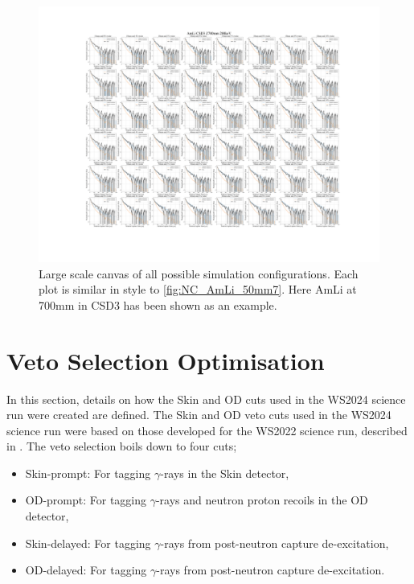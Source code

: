\begin{figure}
	\centering
	\includegraphics[width=\linewidth]{figures/VetoEfficiency/AmLi_CSD3_Z700mm_200keV.png}
	\caption{Large scale canvas of all possible simulation configurations. Each plot is similar in style to \autoref{fig:NC_AmLi_50mm7}. Here AmLi at 700mm in CSD3 has been shown as an example.}
	\label{fig:NC_Canvas}
\end{figure}


\section{Veto Selection Optimisation}
In this section, details on how the Skin and OD cuts used in the WS2024 science run were created are defined. The Skin and OD veto cuts used in the WS2024 science run were based on those developed for the WS2022 science run, described in \cite{LZCollaboration:2024lux}.
The veto selection boils down to four cuts;
\begin{itemize}
	\item Skin-prompt: For tagging $\gamma$-rays in the Skin detector,
	\item OD-prompt: For tagging $\gamma$-rays and neutron proton recoils in the OD detector,
	\item Skin-delayed: For tagging $\gamma$-rays from post-neutron capture de-excitation,
	\item OD-delayed: For tagging $\gamma$-rays from post-neutron capture de-excitation.
\end{itemize}

